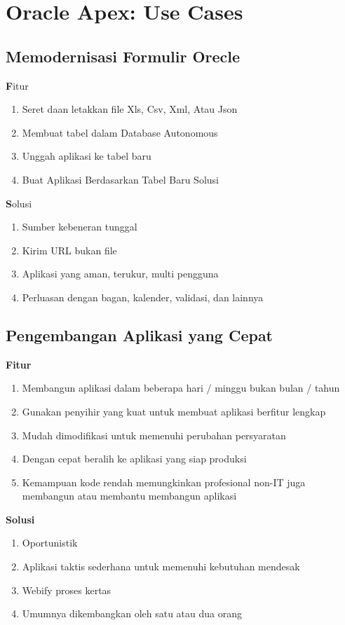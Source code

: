 \documentclass[a4paper,12pt]{report}
\begin{document}
\section{Oracle Apex: Use Cases}
\subsection{Memodernisasi Formulir Orecle }
\textbf Fitur
\begin{enumerate}
    \item Seret daan letakkan file Xls, Csv, Xml, Atau Json
    \item Membuat tabel dalam Database Autonomous
    \item Unggah aplikasi ke tabel baru
    \item Buat Aplikasi Berdasarkan Tabel Baru Solusi 
\end{enumerate}
\textbf Solusi
\begin{enumerate}
    \item Sumber kebeneran tunggal
    \item Kirim URL bukan file
    \item Aplikasi yang aman, terukur, multi pengguna
    \item Perluasan dengan bagan, kalender, validasi, dan lainnya
\end{enumerate}
\subsection{Pengembangan Aplikasi yang Cepat} 
\textbf{Fitur}
\begin{enumerate}
    \item Membangun aplikasi dalam beberapa hari / minggu bukan bulan / tahun
    \item Gunakan penyihir yang kuat untuk membuat aplikasi berfitur lengkap
    \item Mudah dimodifikasi untuk memenuhi perubahan persyaratan
    \item Dengan cepat beralih ke aplikasi yang siap produksi
    \item Kemampuan kode rendah memungkinkan profesional non-IT juga membangun atau membantu membangun aplikasi
\end{enumerate}
\textbf{Solusi}
\begin{enumerate}
    \item Oportunistik
    \item Aplikasi taktis sederhana untuk memenuhi kebutuhan mendesak
    \item Webify proses kertas
    \item Umumnya dikembangkan oleh satu atau dua orang
\end{enumerate}
\end{document}

